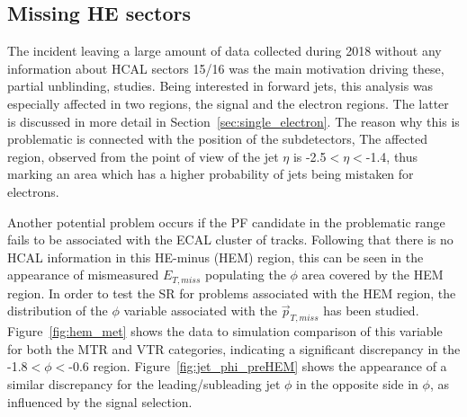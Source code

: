 \subsection{Missing HE sectors}
\hspace{10pt} The incident leaving a large amount of data collected during 2018 without any information about HCAL sectors 15/16 was the main motivation driving these, partial unblinding, studies. Being interested in forward jets, this analysis was especially affected in two regions, the signal and the electron regions. The latter is discussed in more detail in Section~\ref{sec:single_electron}. The reason why this is problematic is connected with the position of the subdetectors, The affected region, observed from the point of view of the jet $\eta$ is -2.5$<\eta<$-1.4, thus marking an area which has a higher probability of jets being mistaken for electrons.

\hspace{10pt} Another potential problem occurs if the PF candidate in the problematic range fails to be associated with the ECAL cluster of tracks. Following that there is no HCAL information in this HE-minus (HEM) region, this can be seen in the appearance of mismeasured $E_{T,miss}$ populating the $\phi$ area covered by the HEM region. In order to test the SR for problems associated with the HEM region, the distribution of the $\phi$ variable associated with the $\vec{p}_{T, miss}$ has been studied. Figure~\ref{fig:hem_met} shows the data to simulation comparison of this variable for both the MTR and VTR categories, indicating a significant discrepancy in the -1.8$<\phi<$-0.6 region. Figure~\ref{fig:jet_phi_preHEM} shows the appearance of a similar discrepancy for the leading/subleading jet $\phi$ in the opposite side in $\phi$, as influenced by the signal selection. 


